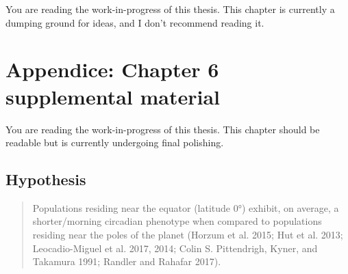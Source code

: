 \documentclass[
  12pt,
  a4paper,
  oneside]{tesesusp}
\begin{document}
\begin{tcolorbox}[enhanced jigsaw, breakable, colback=white, colbacktitle=quarto-callout-important-color!10!white, leftrule=.75mm, left=2mm, toprule=.15mm, opacityback=0, rightrule=.15mm, title=\textcolor{quarto-callout-important-color}{\faExclamation}\hspace{0.5em}{Important}, opacitybacktitle=0.6, bottomtitle=1mm, titlerule=0mm, toptitle=1mm, coltitle=black, colframe=quarto-callout-important-color-frame, bottomrule=.15mm, arc=.35mm]

You are reading the work-in-progress of this thesis. This chapter is
currently a dumping ground for ideas, and I don't recommend reading it.

\end{tcolorbox}

\hypertarget{appendice-chapter-6-supplemental-material}{%
\chapter{Appendice: Chapter 6 supplemental
material}\label{appendice-chapter-6-supplemental-material}}

\begin{tcolorbox}[enhanced jigsaw, breakable, colback=white, colbacktitle=quarto-callout-note-color!10!white, leftrule=.75mm, left=2mm, toprule=.15mm, opacityback=0, rightrule=.15mm, title=\textcolor{quarto-callout-note-color}{\faInfo}\hspace{0.5em}{Note}, opacitybacktitle=0.6, bottomtitle=1mm, titlerule=0mm, toptitle=1mm, coltitle=black, colframe=quarto-callout-note-color-frame, bottomrule=.15mm, arc=.35mm]

You are reading the work-in-progress of this thesis. This chapter should
be readable but is currently undergoing final polishing.

\end{tcolorbox}

\hypertarget{hypothesis}{%
\section{Hypothesis}\label{hypothesis}}

\begin{quote}
Populations residing near the equator (latitude 0°) exhibit, on average,
a shorter/morning circadian phenotype when compared to populations
residing near the poles of the planet (Horzum et al. 2015; Hut et al.
2013; Leocadio-Miguel et al. 2017, 2014; Colin S. Pittendrigh, Kyner,
and Takamura 1991; Randler and Rahafar 2017).
\end{quote}
\end{document}
